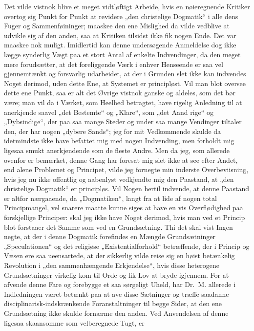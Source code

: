 Det vilde vistnok blive et meget vidtløftigt Arbeide, hvis en
nøieregnende Kritiker overtog sig Punkt for Punkt at revidere „den
christelige Dogmatik“ i alle dens Fuger og Sammenføininger;
maaskee den ene Mislighed da vilde vedblive at udvikle sig af den
anden, saa at Kritiken tilsidst ikke fik nogen Ende. Det var
maaskee nok muligt. Imidlertid kan denne undersøgende Anmeldelse
dog ikke lægge synderlig Vægt paa et stort Antal af enkelte
Indvendinger, da den meget mere forudsætter, at det foreliggende
Værk i enhver Henseende er saa vel gjennemtænkt og forsvarlig
udarbeidet, at der i Grunden slet ikke kan indvendes Noget
derimod, uden dette Ene, at Systemet er principløst. Vil man blot
oversee dette ene Punkt, saa er alt det Øvrige vistnok ganske og
aldeles, som det bør være; man vil da i Værket, som Heelhed
betragtet, have rigelig Anledning til at anerkjende saavel „det
Bestemte“ og „Klare“, som „det Aand%
rige“ og „Dybsindige“, der paa saa mange Steder og under saa mange
Vendinger tiltaler den, der har nogen „dybere Sands“; jeg for mit
Vedkommende skulde da idetmindste ikke have befattet mig med nogen
Indvending, men forholdt mig ligesaa smukt anerkjendende som de
fleste Andre. Men da jeg, som allerede ovenfor er bemærket, denne
Gang har foresat mig slet ikke at see efter Andet, end alene
Problemet og Principet, vilde jeg fornegte min inderste
Overbeviisning, hvis jeg nu ikke offentlig og aabenlyst vedkjendte
mig den Paastand, at „den christelige Dogmatik“ er principløs.
Vil Nogen hertil indvende, at denne Paastand er altfor
nærgaaende, da „Dogmatiken“, langt fra at lide af nogen total
Principmangel, vel snarere maatte kunne siges at have en vis
Overflødighed paa forskjellige Principer: skal jeg ikke have Noget
derimod, hvis man ved et Princip blot forstaaer det Samme som ved
en Grundsætning. Thi det skal vist Ingen negte, at der i denne
Dogmatik forefindes en Mængde Grundsætninger „Speculationen“ og
det religiøse „Existentialforhold“ betræffende, der i Princip og
Væsen ere saa ueensartede, at der sikkerlig vilde reise sig en
høist betænkelig Revolution i „den sammenhængende Erkjendelse“,
hvis disse heterogene Grundsætninger virkelig kom til Orde og fik
Lov at bryde igjennem. For at afvende denne Fare og forebygge et
saa sørgeligt Uheld, har Dr.\ M. allerede i Indledningen været
betænkt paa at ave disse Sætninger og træffe saadanne
disciplinarisk-indskrænkende Foranstaltninger til begge Sider, at
 den ene Grundsætning ikke skulde fornærme den anden. Ved
Anvendelsen af denne ligesaa skaansomme som velberegnede Tugt, er
